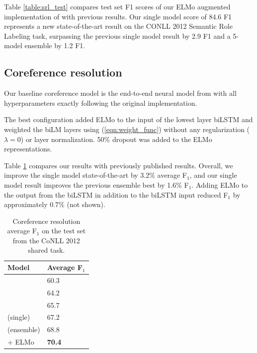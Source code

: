 \documentclass[11pt,a4paper]{article}
\newcommand{\ELMO}{ELMo}
\begin{document}
Table \ref{table:srl_test} compares test set F1 scores of our \ELMO{} augmented implementation of \citep{He2017DeepSR} with previous results. Our single model score of 84.6 F1 represents a new state-of-the-art result on the CONLL 2012 Semantic Role Labeling task, surpassing the previous single model result by 2.9 F1 and a 5-model ensemble by 1.2 F1.

\subsection{Coreference resolution}
Our baseline coreference model is the end-to-end neural model from \citet{Lee2017EndtoendNC} with all hyperparameters exactly following the original implementation.

The best configuration added \ELMO{} to the input of the lowest layer biLSTM and weighted the biLM layers using (\ref{eqn:weight_func}) without any regularization ($\lambda=0$) or layer normalization.
50\% dropout was added to the \ELMO{} representations.

Table \ref{table:coref} compares our results with previously published results.  Overall, we improve the single model state-of-the-art by 3.2\% average F$_1$, and our single model result improves the previous ensemble best by 1.6\% F$_1$.  Adding \ELMO{} to the output from the biLSTM in addition to the biLSTM input reduced F$_1$ by approximately 0.7\% (not shown).

\begin{table}
\centering
\begin{tabular}{l|l}
\textbf{Model}                                & \textbf{Average F$_1$} \\ \hline \hline
\citet{Durrett2013EasyVA}   & 60.3 \\
\citet{Wiseman2016LearningGF}                & 64.2     \\
\citet{Clark2016DeepRL}                  & 65.7      \\
\citet{Lee2017EndtoendNC} (single) & 67.2         \\
\citet{Lee2017EndtoendNC} (ensemble) & 68.8         \\
\citet{Lee2017EndtoendNC} + \ELMO             & \textbf{70.4}       \\
\end{tabular}
\caption{Coreference resolution average F$_1$ on the test set from the CoNLL 2012 shared task.
}
\label{table:coref}
\end{table}
\end{document}
